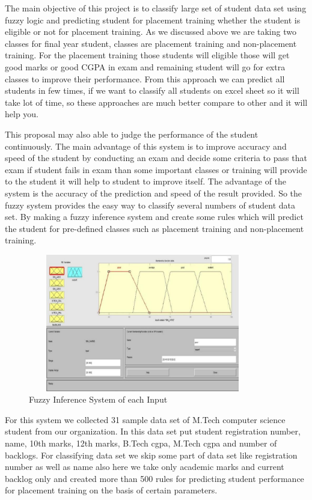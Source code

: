 \documentclass[12pt]{article}
\begin{document}
The main objective of this project is to classify large set of 
student data set using fuzzy logic and predicting student for 
placement training whether the student is eligible or not for 
placement training. As we discussed above we are taking two 
classes for final year student, classes are placement training and 
non-placement training. For the placement training those students 
will eligible those will get good marks or good CGPA in exam 
and remaining student will go for extra classes to improve their 
performance. From this approach we can predict all students in 
few times, if we want to classify all students on excel sheet so it 
will take lot of time, so these approaches are much better compare 
to other and it will help you. 

This proposal may also able to judge the performance of the 
student continuously. The main advantage of this system is to 
improve accuracy and speed of the student by conducting an exam 
and decide some criteria to pass that exam if student fails in exam 
than some important classes or training will provide to the student 
it will help to student to improve itself. The advantage of the 
system is the accuracy of the prediction and speed of the result 
provided. So the fuzzy system provides the easy way to classify 
several numbers of student data set. By making a fuzzy inference 
system and create some rules which will predict the student for 
pre-defined classes such as placement training and non-placement 
training.

\begin{figure}[H]
\begin{center}
 \includegraphics[width=10cm, height=6cm]{L3P1}
\caption{Fuzzy Inference System of each Input}
\end{center}
\end{figure}

For this system we collected 31 sample data set of M.Tech 
computer science student from our organization. In this data set 
put student registration number, name, 10th marks, 12th marks, 
B.Tech cgpa, M.Tech cgpa and number of backlogs. For 
classifying data set we skip some part of data set like registration 
number as well as name also here we take only academic marks 
and current backlog only and created more than 500 rules for 
predicting student performance for placement training on the 
basis of certain parameters. 
\end{document}
